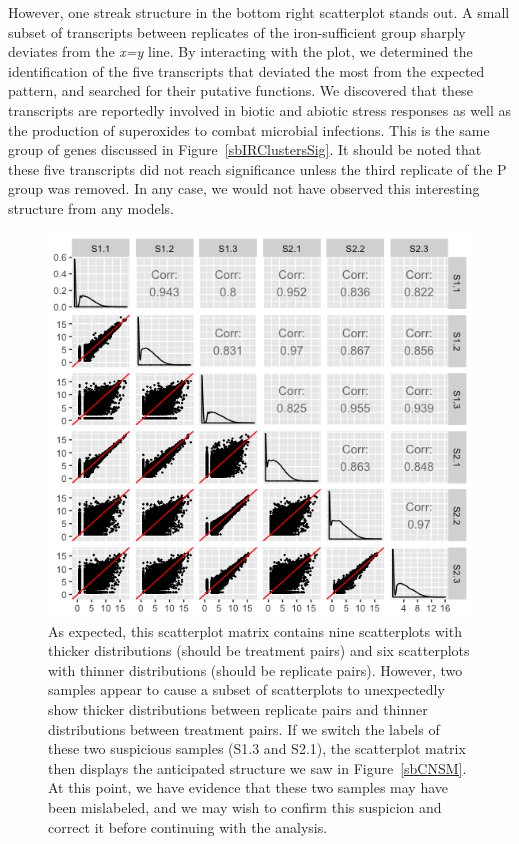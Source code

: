 \documentclass[11pt,a4paper,oldfontcommands,openany]{memoir}
\numberwithin{equation}{section} %
\begin{document}
However, one streak structure in the bottom right scatterplot stands out. A small subset of transcripts between replicates of the iron-sufficient group sharply deviates from the \textit{x=y} line. By interacting with the plot, we determined the identification of the five transcripts that deviated the most from the expected pattern, and searched for their putative functions. We discovered that these transcripts are reportedly involved in biotic and abiotic stress responses as well as the production of superoxides to combat microbial infections. This is the same group of genes discussed in Figure~\ref{sbIRClustersSig}. It should be noted that these five transcripts did not reach significance unless the third replicate of the P group was removed. In any case, we would not have observed this interesting structure from any models.

\begin{figure}[!tpb]
\begin{framed}
\centerline{\includegraphics[width=\columnwidth]{MakeFigures/sbCNSwitchedSM.jpg}}
\end{framed}
\caption{As expected, this scatterplot matrix contains nine scatterplots with thicker distributions (should be treatment pairs) and six scatterplots with thinner distributions (should be replicate pairs). However, two samples appear to cause a subset of scatterplots to unexpectedly show thicker distributions between replicate pairs and thinner distributions between treatment pairs. If we switch the labels of these two suspicious samples (S1.3 and S2.1), the scatterplot matrix then displays the anticipated structure we saw in Figure~\ref{sbCNSM}. At this point, we have evidence that these two samples may have been mislabeled, and we may wish to confirm this suspicion and correct it before continuing with the analysis.
\label{sbCNSwitchedSM}}
\end{figure}
\end{document}
